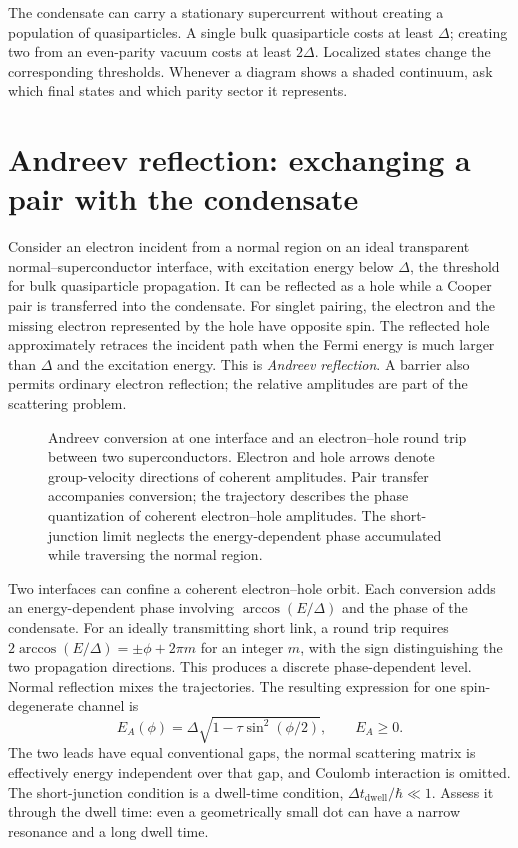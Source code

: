 \begin{physics}
The condensate can carry a stationary supercurrent without creating a population
of quasiparticles. A single bulk quasiparticle costs at least $\Delta$; creating
two from an even-parity vacuum costs at least $2\Delta$. Localized states change
the corresponding thresholds. Whenever a diagram shows a shaded continuum,
ask which final states and which parity sector it represents.
\end{physics}

\section{Andreev reflection: exchanging a pair with the condensate}

Consider an electron incident from a normal region on an ideal transparent
normal--superconductor interface, with excitation energy below $\Delta$, the
threshold for bulk quasiparticle propagation. It can be reflected as a
hole while a Cooper pair is transferred into the condensate. For singlet pairing,
the electron and the missing electron represented by the hole have opposite spin.
The reflected hole approximately retraces the incident path when the Fermi energy
is much larger than $\Delta$ and the excitation energy. This is
\emph{Andreev reflection}. A barrier also permits ordinary electron reflection;
the relative amplitudes are part of the scattering problem.

\begin{figure}[htb]
\centering{}
\caption{Andreev conversion at one interface and an electron--hole round trip
between two superconductors. Electron and hole arrows denote group-velocity
directions of coherent amplitudes. Pair transfer accompanies conversion; the
trajectory describes the phase quantization of coherent electron--hole amplitudes.
The short-junction limit neglects the energy-dependent phase
accumulated while traversing the normal region.}
\label{fig:primer-reflection}
\end{figure}

Two interfaces can confine a coherent electron--hole orbit. Each conversion adds
an energy-dependent phase involving $\arccos(E/\Delta)$ and the phase of the
condensate. For an ideally transmitting short link, a round trip requires
$2\arccos(E/\Delta)=\pm\phi+2\pi m$ for an integer $m$, with the sign distinguishing
the two propagation directions. This produces a discrete phase-dependent level.
Normal reflection mixes the trajectories. The resulting expression for one
spin-degenerate channel is~\cite{beenakker1991josephson,beenakker1991universal}
\begin{equation}\label{eq:contact-abs}
 E_A(\phi)=\Delta\sqrt{1-\tau\sin^2(\phi/2)},\qquad E_A\ge0.
\end{equation}
The two leads have equal conventional gaps, the normal scattering matrix is
effectively energy independent over that gap, and Coulomb interaction is omitted.
The short-junction condition is a dwell-time condition,
$\Delta t_{\mathrm{dwell}}/\hbar\ll1$. Assess it through the dwell time: even a
geometrically small dot can have a narrow resonance and a long dwell time.

